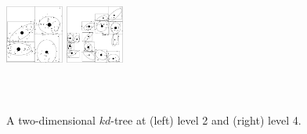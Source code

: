 \documentclass{article}
\begin{document}
\begin{figure}
  \begin{minipage}{1.8in}
    \begin{minipage}{0.8in}
      \includegraphics[width=0.75in,height=1.0in]{kdtree-level2.ps}
    \end{minipage}
    \begin{minipage}{0.8in}
      \includegraphics[width=0.75in,height=1.0in]{kdtree-level4.ps}
    \end{minipage}
    \\
    \begin{minipage}{1.6in}
      \footnotesize{\caption{A two-dimensional $kd$-tree at (left) level 2 and (right) level 4.}}
    \end{minipage}
  \end{minipage}
  \label{fig:kdtree}
\end{figure}
\end{document}
